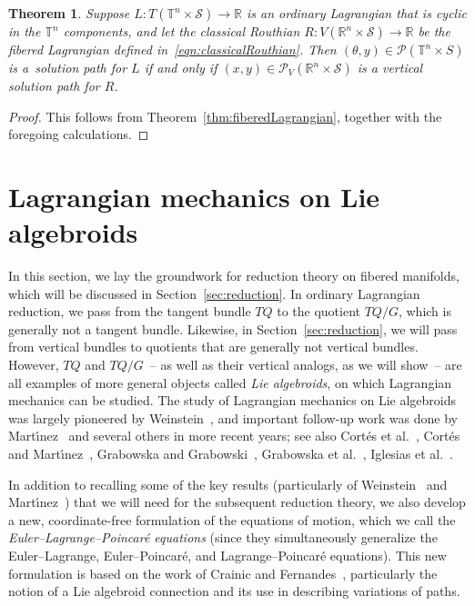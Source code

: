 \documentclass[pdftex]{sigma}
\numberwithin{equation}{section}
\newtheorem{Theorem}{Theorem}[section]
\begin{document}
\begin{Theorem} Suppose $ L \colon T ( \mathbb{T} ^n \times \mathcal{S} ) \rightarrow \mathbb{R} $ is an ordinary Lagrangian that is cyclic in the $ \mathbb{T} ^n $ components, and let the classical Routhian $ R \colon V ( \mathbb{R}^n \times \mathcal{S} ) \rightarrow \mathbb{R} $ be the fibered Lagrangian defined in~\eqref{eqn:classicalRouthian}. Then $ ( \theta , y ) \in \mathcal{P} ( \mathbb{T} ^n \times S ) $ is a~solution path for $L$ if and only if $ ( x, y ) \in \mathcal{P} _V ( \mathbb{R} ^n \times \mathcal{S} ) $ is a vertical solution path for $R$.
\end{Theorem}

\begin{proof}
This follows from Theorem~\ref{thm:fiberedLagrangian}, together with the foregoing calculations.
\end{proof}

\section{Lagrangian mechanics on Lie algebroids}\label{sec:algebroids}

In this section, we lay the groundwork for reduction theory on f\/ibered manifolds, which will be discussed in Section~\ref{sec:reduction}. In ordinary Lagrangian reduction, we pass from the tangent bundle $ T Q $ to the quotient $ T Q / G $, which is generally not a tangent bundle. Likewise, in Section~\ref{sec:reduction}, we will pass from vertical bundles to quotients that are generally not vertical bundles. However, $ T Q $ and $ T Q / G $~-- as well as their vertical analogs, as we will show~-- are all examples of more general objects called \emph{Lie algebroids}, on which Lagrangian mechanics can be studied. The study of Lagrangian mechanics on Lie algebroids was largely pioneered by Weinstein~\cite{Weinstein1996}, and important follow-up work was done by Mart\'{\i}nez~\cite{Martinez2001,Martinez2007,Martinez2008} and several others in more recent years; see also Cort\'es et al.~\cite{CoLeMaMaMa2006}, Cort\'es and Mart\'{\i}nez~\cite{CoMa2004}, Grabowska and Grabowski~\cite{GrGr2008}, Grabowska et al.~\cite{GrUrGr2006}, Iglesias et al.~\cite{IgMaMaMa2008, IgMaMaSo2008}.

In addition to recalling some of the key results (particularly of Weinstein~\cite{Weinstein1996} and Mart\'{\i}nez~\cite{Martinez2001}) that we will need for the subsequent reduction theory, we also develop a new, coordinate-free formulation of the equations of motion, which we call the \emph{Euler--Lagrange--Poincar\'e equations} (since they simultaneously generalize the Euler--Lagrange, Euler--Poincar\'e, and Lagrange--Poincar\'e equations). This new formulation is based on the work of Crainic and Fernandes~\cite{CrFe2003}, particularly the notion of a Lie algebroid connection and its use in describing variations of paths.
\end{document}

